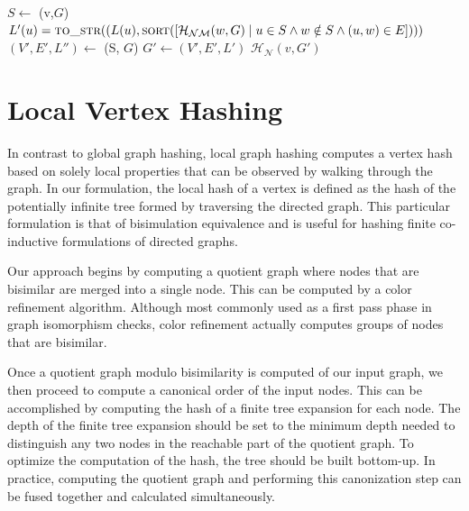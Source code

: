 \documentclass{svproc}
\begin{document}
\begin{algorithm}
    \caption{Merkle Graph Node Hashing}\label{alg:merklegraphhash}
    \begin{algorithmic}[1]
        \State $S \gets$ (v,$G$) 
        \State $L'(u)=\textproc{to\_str}((L(u),\textproc{sort}([\mathcal{H_{NM}}(w,G) \mid u \in S \land w \notin S \land (u,w) \in E])))$ \\ 
        \State $(V', E', L'') \gets$ (S, $G$)
        \State $G' \gets (V',E',L')$
        \State \Return $\mathcal{H_N}(v, G')$ 
    \EndFunction
    \end{algorithmic}
\end{algorithm}

\section{Local Vertex Hashing}

In contrast to global graph hashing, local graph hashing computes a vertex hash based on solely local properties that can be observed by walking through the graph. In our formulation, the local hash of a vertex is defined as the hash of the potentially infinite tree formed by traversing the directed graph. This particular formulation is that of bisimulation equivalence and is useful for hashing finite co-inductive formulations of directed graphs.

Our approach begins by computing a quotient graph where nodes that are bisimilar are merged into a single node. This can be computed by a color refinement algorithm. Although most commonly used as a first pass phase in graph isomorphism checks, color refinement actually computes groups of nodes that are bisimilar.

Once a quotient graph modulo bisimilarity is computed of our input graph, we then proceed to compute a canonical order of the input nodes. This can be accomplished by computing the hash of a finite tree expansion for each node. The depth of the finite tree expansion should be set to the minimum depth needed to distinguish any two nodes in the reachable part of the quotient graph. To optimize the computation of the hash, the tree should be built bottom-up. In practice, computing the quotient graph and performing this canonization step can be fused together and calculated simultaneously.
\end{document}
